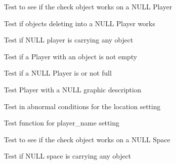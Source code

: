 \begin{DoxyRefList}
\item[\label{test__test000211}%
\hypertarget{test__test000211}{}%
Member \hyperlink{player__test_8h_a874f5bf56d0cca218979fee114a90d22}{test3\+\_\+player\+\_\+check\+\_\+object} ()]Test to see if the check object works on a N\+U\+LL Player  
\item[\label{test__test000201}%
\hypertarget{test__test000201}{}%
Member \hyperlink{player__test_8h_a452322fef33fc8706043c5067352eccd}{test3\+\_\+player\+\_\+del\+\_\+object} ()]Test if objects deleting into a N\+U\+LL Player works  
\item[\label{test__test000193}%
\hypertarget{test__test000193}{}%
Member \hyperlink{player__test_8h_a61bbeaff50cc839f226a53ed9b808784}{test3\+\_\+player\+\_\+get\+\_\+objects\+\_\+number} ()]Test if N\+U\+LL player is carrying any object  
\item[\label{test__test000204}%
\hypertarget{test__test000204}{}%
Member \hyperlink{player__test_8h_a08b329fb04b5d2a9023492e00bd19e48}{test3\+\_\+player\+\_\+is\+\_\+empty} ()]Test if a Player with an object is not empty  
\item[\label{test__test000207}%
\hypertarget{test__test000207}{}%
Member \hyperlink{player__test_8h_a8260b22f8889de8693acc075136697f3}{test3\+\_\+player\+\_\+is\+\_\+full} ()]Test if a N\+U\+LL Player is or not full  
\item[\label{test__test000179}%
\hypertarget{test__test000179}{}%
Member \hyperlink{player__test_8h_a7f865b46cfa086222fe0bfd1b9ed97f7}{test3\+\_\+player\+\_\+set\+\_\+graphic\+\_\+description} ()]Test Player with a N\+U\+LL graphic description  
\item[\label{test__test000182}%
\hypertarget{test__test000182}{}%
Member \hyperlink{player__test_8h_a317c0c84ef6ef843c15d5bab4a6b8a38}{test3\+\_\+player\+\_\+set\+\_\+location} ()]Test in abnormal conditions for the location setting  
\item[\label{test__test000176}%
\hypertarget{test__test000176}{}%
Member \hyperlink{player__test_8h_a447ebbb4ba2206abeaf4b60200e312da}{test3\+\_\+player\+\_\+set\+\_\+name} ()]Test function for player\+\_\+name setting  
\item[\label{test__test000264}%
\hypertarget{test__test000264}{}%
Member \hyperlink{space__test_8h_ab10ca9900e9610c2af3b7a5348f58b9d}{test3\+\_\+space\+\_\+check\+\_\+object} ()]Test to see if the check object works on a N\+U\+LL Space  
\item[\label{test__test000251}%
\hypertarget{test__test000251}{}%
Member \hyperlink{space__test_8h_ae690b65f5bd9c3a3bc7dbb1ecc746447}{test3\+\_\+space\+\_\+get\+\_\+objects\+\_\+number} ()]Test if N\+U\+LL space is carrying any object  

\end{DoxyRefList}
